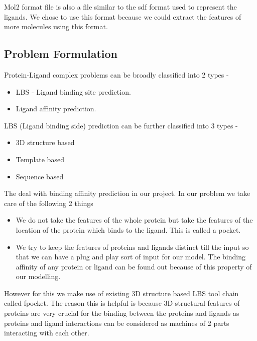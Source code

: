 \documentclass[11pt]{article}
\begin{document}
Mol2 format file is also a file similar to the sdf format used to represent the ligands.
We chose to use this format because we could extract the features of more molecules using this format.


\subsection{Problem Formulation}
Protein-Ligand complex problems can be broadly classified into 2 types -
\begin{itemize}
\item LBS - Ligand binding site prediction.
\item Ligand affinity prediction.
\end{itemize} 

LBS (Ligand binding side) prediction can be further classified into 3 types -
\begin{itemize}
\item 3D structure based
\item Template based
\item Sequence based
\end{itemize}

The deal with binding affinity prediction in our project.
In our problem we take care of the following 2 things
\begin{itemize}
\item We do not take the features of the whole protein
but take the features of the location of the protein which binds to the ligand.
This is called a pocket.
\item We try to keep the features of proteins and ligands distinct till the input so that we can have a plug and play sort of input for our model.
The binding affinity of any protein or ligand can be found out because of this property of our modelling.
\end{itemize}

However for this we make use of existing 3D structure based LBS tool chain called fpocket.
The reason this is helpful is because 3D structural features of proteins are very crucial for the binding between 
the proteins and ligands as proteins and ligand interactions can be considered as
machines of 2 parts interacting with each other.
\end{document}
